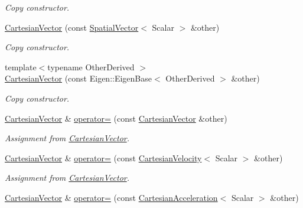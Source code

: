 \begin{DoxyCompactItemize}
\begin{DoxyCompactList}\small\item\em Copy constructor. \end{DoxyCompactList}\item 
\hyperlink{classow__core_1_1CartesianVector_a8c4a48973543859272592426ca9e262f}{Cartesian\+Vector} (const \hyperlink{classow__core_1_1SpatialVector}{Spatial\+Vector}$<$ Scalar $>$ \&other)\hypertarget{classow__core_1_1CartesianVector_a8c4a48973543859272592426ca9e262f}{}\label{classow__core_1_1CartesianVector_a8c4a48973543859272592426ca9e262f}

\begin{DoxyCompactList}\small\item\em Copy constructor. \end{DoxyCompactList}\item 
{\footnotesize template$<$typename Other\+Derived $>$ }\\\hyperlink{classow__core_1_1CartesianVector_acc39976952afd1141bdb95ad1802e320}{Cartesian\+Vector} (const Eigen\+::\+Eigen\+Base$<$ Other\+Derived $>$ \&other)
\begin{DoxyCompactList}\small\item\em Copy constructor. \end{DoxyCompactList}\item 
\hyperlink{classow__core_1_1CartesianVector}{Cartesian\+Vector} \& \hyperlink{classow__core_1_1CartesianVector_aabbdc87ff25037dab28e29dcdd65091f}{operator=} (const \hyperlink{classow__core_1_1CartesianVector}{Cartesian\+Vector} \&other)\hypertarget{classow__core_1_1CartesianVector_aabbdc87ff25037dab28e29dcdd65091f}{}\label{classow__core_1_1CartesianVector_aabbdc87ff25037dab28e29dcdd65091f}

\begin{DoxyCompactList}\small\item\em Assignment from \hyperlink{classow__core_1_1CartesianVector}{Cartesian\+Vector}. \end{DoxyCompactList}\item 
\hyperlink{classow__core_1_1CartesianVector}{Cartesian\+Vector} \& \hyperlink{classow__core_1_1CartesianVector_a7500838c3ffb3d98107c5d6dff9c03bd}{operator=} (const \hyperlink{classow__core_1_1CartesianVelocity}{Cartesian\+Velocity}$<$ Scalar $>$ \&other)\hypertarget{classow__core_1_1CartesianVector_a7500838c3ffb3d98107c5d6dff9c03bd}{}\label{classow__core_1_1CartesianVector_a7500838c3ffb3d98107c5d6dff9c03bd}

\begin{DoxyCompactList}\small\item\em Assignment from \hyperlink{classow__core_1_1CartesianVector}{Cartesian\+Vector}. \end{DoxyCompactList}\item 
\hyperlink{classow__core_1_1CartesianVector}{Cartesian\+Vector} \& \hyperlink{classow__core_1_1CartesianVector_a11d0ac38523add6fb946e2563500b8c4}{operator=} (const \hyperlink{classow__core_1_1CartesianAcceleration}{Cartesian\+Acceleration}$<$ Scalar $>$ \&other)\hypertarget{classow__core_1_1CartesianVector_a11d0ac38523add6fb946e2563500b8c4}{}\label{classow__core_1_1CartesianVector_a11d0ac38523add6fb946e2563500b8c4}


\end{DoxyCompactItemize}
